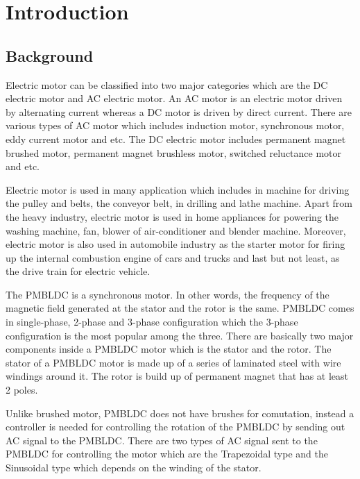 \chapter{Introduction}\label{chap:intro}
\section{Background}

Electric motor can be classified into two major categories which are the DC electric motor and AC electric motor. An AC motor is an electric motor driven by alternating current whereas a DC motor is driven by direct current. There are various types of AC motor which includes induction motor, synchronous motor, eddy current motor and etc. The DC electric motor includes permanent magnet brushed motor, permanent magnet brushless motor, switched reluctance motor and etc.

Electric motor is used in many application which includes in machine for driving the pulley and belts, the conveyor belt, in drilling and lathe machine. Apart from the heavy industry, electric motor is used in home appliances for powering the washing machine, fan, blower of air-conditioner and blender machine. Moreover, electric motor is also used in automobile industry as the starter motor for firing up the internal combustion engine of cars and trucks and last but not least, as the drive train for electric vehicle.

The PMBLDC is a synchronous motor. In other words, the frequency of the magnetic field generated at the stator and the rotor is the same. PMBLDC comes in single-phase, 2-phase and 3-phase configuration which the 3-phase configuration is the most popular among the three. There are basically two major components inside a PMBLDC motor which is the stator and the rotor. The stator of a PMBLDC motor is made up of 
a series of laminated steel with wire windings around it. The rotor is build up of permanent magnet that has at least 2 poles.

Unlike brushed motor, PMBLDC does not have brushes for comutation, instead a controller is needed for controlling the rotation of the PMBLDC by sending out AC signal to the PMBLDC. There are two types of AC signal sent to the PMBLDC for controlling the motor which are the Trapezoidal type and the Sinusoidal type which depends on the winding of the stator.



